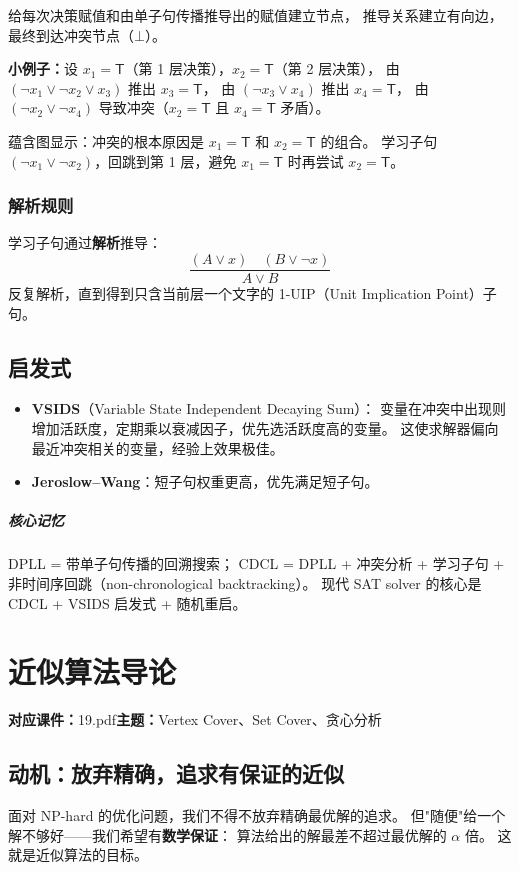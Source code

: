\documentclass[UTF8,openany,12pt]{ctexbook}
\theoremstyle{remark}
\newcommand{\lecture}[3]{
  \chapter{#2}
  \noindent\textbf{对应课件：}#1\hfill\textbf{主题：}#3
  \vspace{0.6em}
}
\newcommand{\keypoint}[1]{\paragraph{核心记忆}#1}
\begin{document}
给每次决策赋值和由单子句传播推导出的赋值建立节点，
推导关系建立有向边，最终到达冲突节点（$\bot$）。

\textbf{小例子：}设 $x_1 = \mathsf{T}$（第 1 层决策），$x_2 = \mathsf{T}$（第 2 层决策），
由 $(\neg x_1 \vee \neg x_2 \vee x_3)$ 推出 $x_3 = \mathsf{T}$，
由 $(\neg x_3 \vee x_4)$ 推出 $x_4 = \mathsf{T}$，
由 $(\neg x_2 \vee \neg x_4)$ 导致冲突（$x_2 = \mathsf{T}$ 且 $x_4 = \mathsf{T}$ 矛盾）。

蕴含图显示：冲突的根本原因是 $x_1 = \mathsf{T}$ 和 $x_2 = \mathsf{T}$ 的组合。
学习子句 $(\neg x_1 \vee \neg x_2)$，回跳到第 1 层，避免 $x_1=\mathsf{T}$ 时再尝试 $x_2 = \mathsf{T}$。

\subsection{解析规则}

学习子句通过\textbf{解析}推导：
\[
  \frac{(A \vee x) \quad (B \vee \neg x)}{A \vee B}
\]
反复解析，直到得到只含当前层一个文字的 1-UIP（Unit Implication Point）子句。

\section{启发式}

\begin{itemize}
  \item \textbf{VSIDS}（Variable State Independent Decaying Sum）：
        变量在冲突中出现则增加活跃度，定期乘以衰减因子，优先选活跃度高的变量。
        这使求解器偏向最近冲突相关的变量，经验上效果极佳。
  \item \textbf{Jeroslow--Wang}：短子句权重更高，优先满足短子句。
\end{itemize}

\keypoint{
  DPLL = 带单子句传播的回溯搜索；
  CDCL = DPLL + 冲突分析 + 学习子句 + 非时间序回跳（non-chronological backtracking）。
  现代 SAT solver 的核心是 CDCL + VSIDS 启发式 + 随机重启。
}

\lecture{19.pdf}{近似算法导论}{Vertex Cover、Set Cover、贪心分析}

\section*{动机：放弃精确，追求有保证的近似}

面对 NP-hard 的优化问题，我们不得不放弃精确最优解的追求。
但"随便"给一个解不够好——我们希望有\textbf{数学保证}：
算法给出的解最差不超过最优解的 $\alpha$ 倍。
这就是近似算法的目标。
\end{document}
